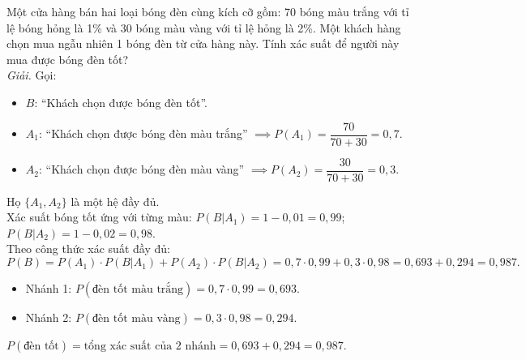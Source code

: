 \begin{vidu}
Một cửa hàng bán hai loại bóng đèn cùng kích cỡ gồm: 70 bóng màu trắng với tỉ lệ bóng hỏng là 1\% và 30 bóng màu vàng với tỉ lệ hỏng là 2\%. Một khách hàng chọn mua ngẫu nhiên 1 bóng đèn từ cửa hàng này. Tính xác suất để người này mua được bóng đèn tốt?\\
\textit{Giải.} 
Gọi:
\begin{itemize}
    \item $B$: ``Khách chọn được bóng đèn tốt''.
    \item $A_1$: ``Khách chọn được bóng đèn màu trắng'' $\implies P(A_1) = \dfrac{70}{70 + 30} = 0{,}7$.
    \item $A_2$: ``Khách chọn được bóng đèn màu vàng'' $\implies P(A_2) = \dfrac{30}{70 + 30} = 0{,}3$.
\end{itemize}
Họ $\{A_1, A_2\}$ là một hệ đầy đủ.\\
Xác suất bóng tốt ứng với từng màu:
$P(B|A_1) = 1 - 0{,}01 = 0{,}99$;\quad $P(B|A_2) = 1 - 0{,}02 = 0{,}98$.\\
Theo công thức xác suất đầy đủ:
\[
P(B) = P(A_1) \cdot P(B|A_1) + P(A_2) \cdot P(B|A_2) = 0{,}7 \cdot 0{,}99 + 0{,}3 \cdot 0{,}98 = 0{,}693 + 0{,}294 = 0{,}987.
\]
\end{vidu}

\begin{chuy}
\begin{itemize}
    \item Nhánh 1: $P(\text{đèn tốt màu trắng}) = 0{,}7 \cdot 0{,}99 = 0{,}693$.
    \item Nhánh 2: $P(\text{đèn tốt màu vàng}) = 0{,}3 \cdot 0{,}98 = 0{,}294$.
\end{itemize}
$P(\text{đèn tốt}) = \text{tổng xác suất của 2 nhánh} = 0{,}693 + 0{,}294 = 0{,}987$.
\end{chuy}


